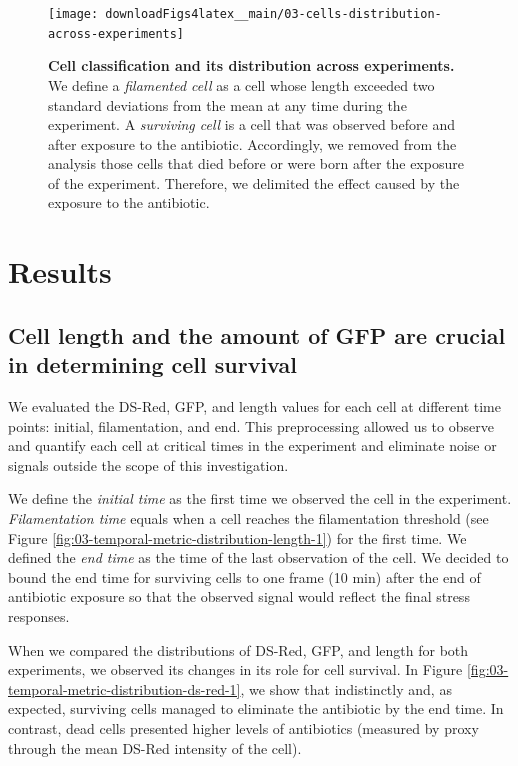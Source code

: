 \documentclass[a4paper, nobind]{templates/ociamthesis}
\begin{document}
\begin{figure}[H]
\texttt{[image: downloadFigs4latex\_\_main/03-cells-distribution-across-experiments]} \caption[Cell classification and its distribution across experiments.]{\textbf{Cell classification and its distribution across experiments.} We define a \emph{filamented cell} as a cell whose length exceeded two standard deviations from the mean at any time during the experiment. A \emph{surviving cell} is a cell that was observed before and after exposure to the antibiotic. Accordingly, we removed from the analysis those cells that died before or were born after the exposure of the experiment. Therefore, we delimited the effect caused by the exposure to the antibiotic.}\label{fig:03-cells-distribution-across-experiments}
\end{figure}

\hypertarget{results}{%
\section{Results}\label{results}}

\hypertarget{cell-length-and-the-amount-of-gfp-are-crucial-in-determining-cell-survival}{%
\subsection{Cell length and the amount of GFP are crucial in determining cell survival}\label{cell-length-and-the-amount-of-gfp-are-crucial-in-determining-cell-survival}}

We evaluated the DS-Red, GFP, and length values for each cell at different time points: initial, filamentation, and end.
This preprocessing allowed us to observe and quantify each cell at critical times in the experiment and eliminate noise or signals outside the scope of this investigation.

We define the \emph{initial time} as the first time we observed the cell in the experiment.
\emph{Filamentation time} equals when a cell reaches the filamentation threshold (see Figure \ref{fig:03-temporal-metric-distribution-length-1}) for the first time.
We defined the \emph{end time} as the time of the last observation of the cell.
We decided to bound the end time for surviving cells to one frame (10 min) after the end of antibiotic exposure so that the observed signal would reflect the final stress responses.

When we compared the distributions of DS-Red, GFP, and length for both experiments, we observed its changes in its role for cell survival.
In Figure \ref{fig:03-temporal-metric-distribution-ds-red-1}, we show that indistinctly and, as expected, surviving cells managed to eliminate the antibiotic by the end time.
In contrast, dead cells presented higher levels of antibiotics (measured by proxy through the mean DS-Red intensity of the cell).
\end{document}

